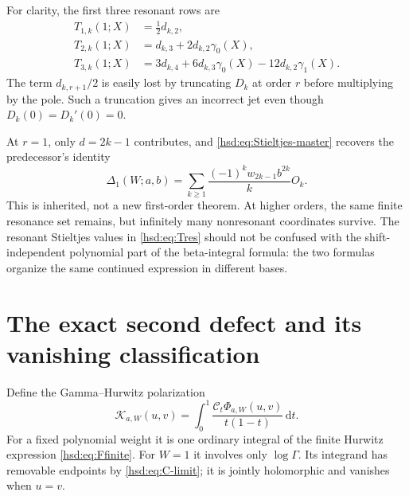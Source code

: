 \documentclass[11pt]{article}
\numberwithin{equation}{section}
\theoremstyle{definition}\newtheorem{definition}[theorem]{Definition}
\theoremstyle{remark}\newtheorem{remark}[theorem]{Remark}
\newcommand{\dd}{\,\mathrm d}
\newcommand{\CC}{\mathcal C}
\newcommand{\KK}{\mathcal K}
\begin{document}
For clarity, the first three resonant rows are
\begin{align}
 T_{1,k}(1;X)&=\tfrac12d_{k,2},\label{hsd:eq:res1}\\
 T_{2,k}(1;X)&=d_{k,3}+2d_{k,2}\gamma_0(X),\label{hsd:eq:res2}\\
 T_{3,k}(1;X)&=3d_{k,4}+6d_{k,3}\gamma_0(X)
                         -12d_{k,2}\gamma_1(X).\label{hsd:eq:res3}
\end{align}
The term $d_{k,r+1}/2$ is easily lost by truncating $D_k$ at order $r$
before multiplying by the pole. Such a truncation gives an incorrect
jet even though $D_k(0)=D_k'(0)=0$.

At $r=1$, only $d=2k-1$ contributes, and
\eqref{hsd:eq:Stieltjes-master} recovers the predecessor's identity
\begin{equation}\label{hsd:eq:first-anomaly}
 \Delta_1(W;a,b)=\sum_{k\ge1}
             \frac{(-1)^kw_{2k-1}b^{2k}}k O_k.
\end{equation}
This is inherited, not a new first-order theorem. At higher orders,
the same finite resonance set remains, but infinitely many nonresonant
coordinates survive. The resonant Stieltjes values in
\eqref{hsd:eq:Tres} should not be confused with the shift-independent
polynomial part of the beta-integral formula: the two formulas organize
the same continued expression in different bases.

\section{The exact second defect and its vanishing classification}
\label{hsd:sec:gamma}
Define the Gamma--Hurwitz polarization
\begin{equation}\label{hsd:eq:K}
 \KK_{a,W}(u,v)=\int_0^1\frac{\CC_t\Phi_{a,W}(u,v)}{t(1-t)}\dd t.
\end{equation}
For a fixed polynomial weight it is one ordinary integral of the finite
Hurwitz expression \eqref{hsd:eq:Ffinite}. For $W=1$ it involves only
$\log\Gamma$. Its integrand has removable endpoints by
\eqref{hsd:eq:C-limit}; it is jointly holomorphic and vanishes when $u=v$.
\end{document}
